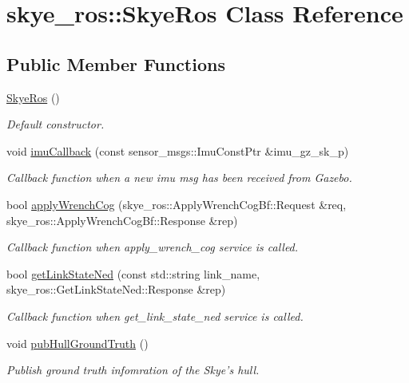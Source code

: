 \hypertarget{classskye__ros_1_1_skye_ros}{\section{skye\-\_\-ros\-:\-:Skye\-Ros Class Reference}
\label{classskye__ros_1_1_skye_ros}
}
\subsection*{Public Member Functions}
\begin{DoxyCompactItemize}
\item 
\hypertarget{classskye__ros_1_1_skye_ros_a267dbb96c571ccfb1bea0a082b5cfb32}{\hyperlink{classskye__ros_1_1_skye_ros_a267dbb96c571ccfb1bea0a082b5cfb32}{Skye\-Ros} ()}\label{classskye__ros_1_1_skye_ros_a267dbb96c571ccfb1bea0a082b5cfb32}

\begin{DoxyCompactList}\small\item\em Default constructor. \end{DoxyCompactList}\item 
void \hyperlink{classskye__ros_1_1_skye_ros_a7fce94bed2f513ee63aac089ccf40538}{imu\-Callback} (const sensor\-\_\-msgs\-::\-Imu\-Const\-Ptr \&imu\-\_\-gz\-\_\-sk\-\_\-p)
\begin{DoxyCompactList}\small\item\em Callback function when a new imu msg has been received from Gazebo. \end{DoxyCompactList}\item 
bool \hyperlink{classskye__ros_1_1_skye_ros_a3b89852664ebf528e0efd005dfee1cb6}{apply\-Wrench\-Cog} (skye\-\_\-ros\-::\-Apply\-Wrench\-Cog\-Bf\-::\-Request \&req, skye\-\_\-ros\-::\-Apply\-Wrench\-Cog\-Bf\-::\-Response \&rep)
\begin{DoxyCompactList}\small\item\em Callback function when apply\-\_\-wrench\-\_\-cog service is called. \end{DoxyCompactList}\item 
bool \hyperlink{classskye__ros_1_1_skye_ros_ac4bd9e5c80045fdf72a0e43eb43434e2}{get\-Link\-State\-Ned} (const std\-::string link\-\_\-name, skye\-\_\-ros\-::\-Get\-Link\-State\-Ned\-::\-Response \&rep)
\begin{DoxyCompactList}\small\item\em Callback function when get\-\_\-link\-\_\-state\-\_\-ned service is called. \end{DoxyCompactList}\item 
void \hyperlink{classskye__ros_1_1_skye_ros_a8e2c41ab1a0aa514dff6d31aa6fcd008}{pub\-Hull\-Ground\-Truth} ()
\begin{DoxyCompactList}\small\item\em Publish ground truth infomration of the Skye's hull. \end{DoxyCompactList}\end{DoxyCompactItemize}


